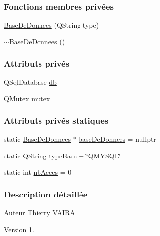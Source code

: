 \subsubsection*{Fonctions membres privées}
\begin{DoxyCompactItemize}
\item 
\hyperlink{class_base_de_donnees_a10dd177f1008f675ab78c2221b2a6750}{Base\+De\+Donnees} (Q\+String type)
\item 
\hyperlink{class_base_de_donnees_a5dc474cdbe003644fb0ca7b8f2ec6b93}{$\sim$\+Base\+De\+Donnees} ()
\end{DoxyCompactItemize}
\subsubsection*{Attributs privés}
\begin{DoxyCompactItemize}
\item 
Q\+Sql\+Database \hyperlink{class_base_de_donnees_a3e738dcf443370c46a541677ab619f06}{db}
\item 
Q\+Mutex \hyperlink{class_base_de_donnees_aa1b4696fac87a740f914aa73739086f2}{mutex}
\end{DoxyCompactItemize}
\subsubsection*{Attributs privés statiques}
\begin{DoxyCompactItemize}
\item 
static \hyperlink{class_base_de_donnees}{Base\+De\+Donnees} $\ast$ \hyperlink{class_base_de_donnees_a822ba0b7cf85b1e48ced8efd3d65e266}{base\+De\+Donnees} = nullptr
\item 
static Q\+String \hyperlink{class_base_de_donnees_ab682b82167f494496a6531bfe522b42b}{type\+Base} = \char`\"{}Q\+M\+Y\+S\+QL\char`\"{}
\item 
static int \hyperlink{class_base_de_donnees_a5099ecb2922bb31d84cd5d4505298a29}{nb\+Acces} = 0
\end{DoxyCompactItemize}


\subsubsection{Description détaillée}
\begin{DoxyAuthor}{Auteur}
Thierry V\+A\+I\+RA
\end{DoxyAuthor}
\begin{DoxyVersion}{Version}
1. 
\end{DoxyVersion}


